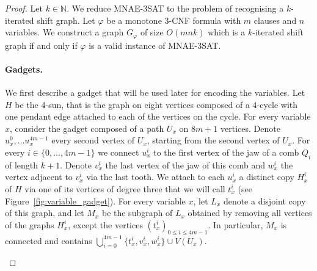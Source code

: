 \documentclass[11pt,a4aper]{article}
\renewcommand{\le}{\leqslant}
\renewcommand{\phi}{\varphi}
\newcommand*{\MNAE}{\textsc{MNAE-3SAT} }
\begin{document}
\begin{proof}
  Let $k \in \mathbb{N}$. We reduce \MNAE to the problem of recognising a $k$-iterated shift
  graph. Let $\phi$ be a monotone 3-CNF formula with $m$
  clauses and $n$ variables. We construct a graph $G_\phi$ of size $O(mnk)$ which is a $k$-iterated shift graph if and only if
  $\phi$ is a valid instance of \textsc{MNAE-3SAT}.

  \paragraph{Gadgets.}
  We first describe a gadget that will be used later for encoding the
  variables. Let $H$ be the 4-sun, that is the graph on eight vertices composed
  of a 4-cycle with one pendant edge attached to each of the vertices on the
  cycle. For every variable $x$, consider the gadget composed of a path $U_x$ on
  $8m+1$ vertices. Denote $u_x^0, \dots u_x^{4m-1}$ every second vertex of $U_x$,
  starting from the second vertex of $U_x$. For every $i \in \{0, \dots, 4m-1\}$
  we connect $u_x^{i}$ to the first vertex of the jaw of a comb $Q_i$ of length
  $k+1$. Denote $v_x^{i}$ the last vertex of the jaw of this comb and
  $w_x^{i}$ the vertex adjacent to $v_x^{i}$ via the last tooth.
  We attach to each $u_x^{i}$ a
  distinct copy $H_x^i$ of $H$ via one of its vertices of degree three that we
  will call $t_x^{i}$ (see Figure~\ref{fig:variable_gadget}). For every variable $x$,
  let $L_x$ denote a disjoint copy of this graph, and let $M_x$ be the subgraph
  of $L_x$ obtained by removing all vertices of the graphs $H_x^i$, except the
  vertices $(t_x^{i})_{0 \le i \le 4m-1}$. In particular, $M_x$ is connected and contains
  $\bigcup_{i=0}^{4m-1} \{t_x^{i}, v_x^{i}, w_x^{i}\} \cup V(U_x)$.


  \begin{figure}[h!]
    \centering
\end{figure}
\end{proof}
\end{document}

